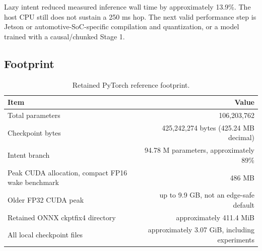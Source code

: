 \documentclass[11pt,a4paper]{article}
\begin{document}
Lazy intent reduced measured inference wall time by approximately 13.9\%.
The host CPU still does not sustain a 250 ms hop. The next valid performance
step is Jetson or automotive-SoC-specific compilation and quantization, or a
model trained with a causal/chunked Stage 1.

\subsection{Footprint}

\begin{table}[H]
\centering
\caption{Retained PyTorch reference footprint.}
\label{tab:footprint}
\small
\begin{tabular}{@{}lr@{}}
\toprule
\textbf{Item} & \textbf{Value}\\
\midrule
Total parameters & 106,203,762\\
Checkpoint bytes & 425,242,274 bytes (425.24 MB decimal)\\
Intent branch & 94.78 M parameters, approximately 89\%\\
Peak CUDA allocation, compact FP16 wake benchmark & 486 MB\\
Older FP32 CUDA peak & up to 9.9 GB, not an edge-safe default\\
Retained ONNX ckptfix4 directory & approximately 411.4 MiB\\
All local checkpoint files & approximately 3.07 GiB, including experiments\\
\bottomrule
\end{tabular}
\end{table}
\end{document}
